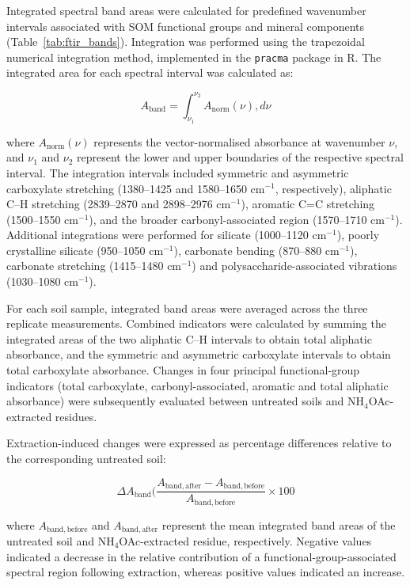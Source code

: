 \documentclass[preprint,12pt]{elsarticle}
\begin{document}
Integrated spectral band areas were calculated for predefined wavenumber intervals associated with SOM functional groups and mineral components (Table~\ref{tab:ftir_bands}). Integration was performed using the trapezoidal numerical integration method, implemented in the \texttt{pracma} package in R. The integrated area for each spectral interval was calculated as:

\begin{equation}
A_{\mathrm{band}} =
\int_{\nu_1}^{\nu_2}
A_{\mathrm{norm}}(\nu),d\nu
\label{eq:ftir_band_integration}
\end{equation}

where $A_{\mathrm{norm}}(\nu)$ represents the vector-normalised absorbance at wavenumber $\nu$, and $\nu_1$ and $\nu_2$ represent the lower and upper boundaries of the respective spectral interval. The integration intervals included symmetric and asymmetric carboxylate stretching (1380--1425 and 1580--1650 cm$^{-1}$, respectively), aliphatic C--H stretching (2839--2870 and 2898--2976 cm$^{-1}$), aromatic C=C stretching (1500--1550 cm$^{-1}$), and the broader carbonyl-associated region (1570--1710 cm$^{-1}$). Additional integrations were performed for silicate (1000--1120 cm$^{-1}$), poorly crystalline silicate (950--1050 cm$^{-1}$), carbonate bending (870--880 cm$^{-1}$), carbonate stretching (1415--1480 cm$^{-1}$) and polysaccharide-associated vibrations (1030--1080 cm$^{-1}$).

For each soil sample, integrated band areas were averaged across the three replicate measurements. Combined indicators were calculated by summing the integrated areas of the two aliphatic C--H intervals to obtain total aliphatic absorbance, and the symmetric and asymmetric carboxylate intervals to obtain total carboxylate absorbance. Changes in four principal functional-group indicators (total carboxylate, carbonyl-associated, aromatic and total aliphatic absorbance) were subsequently evaluated between untreated soils and NH$_4$OAc-extracted residues.

Extraction-induced changes were expressed as percentage differences relative to the corresponding untreated soil:

\begin{equation}
\Delta A_{\mathrm{band}} (%
\frac{
A_{\mathrm{band,after}} -
A_{\mathrm{band,before}}
}{
A_{\mathrm{band,before}}
}
\times 100
\label{eq:ftir_percentage_change}
\end{equation}

where $A_{\mathrm{band,before}}$ and $A_{\mathrm{band,after}}$ represent the mean integrated band areas of the untreated soil and NH$_4$OAc-extracted residue, respectively. Negative values indicated a decrease in the relative contribution of a functional-group-associated spectral region following extraction, whereas positive values indicated an increase. 
\end{document}

